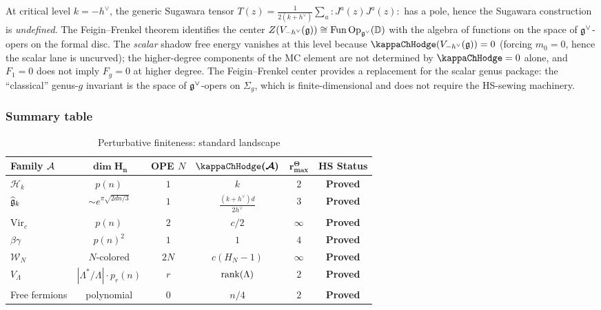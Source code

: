 \begin{remark}
At critical level $k = -h^\vee$, the generic Sugawara tensor $T(z) = \frac{1}{2(k+h^\vee)} \sum_a :J^a(z) J^a(z):$ has a pole, hence the Sugawara construction is \emph{undefined}. The Feigin--Frenkel theorem identifies the center $Z(V_{-h^\vee}(\mathfrak{g})) \cong \mathrm{Fun}\,\mathrm{Op}_{\mathfrak{g}^\vee}(\mathbb{D})$ with the algebra of functions on the space of $\mathfrak{g}^\vee$-opers on the formal disc. The \emph{scalar} shadow free energy vanishes at this level because $\kappaChHodge(V_{-h^\vee}(\fg)) = 0$ (forcing $m_0 = 0$, hence the scalar lane is uncurved); the higher-degree components of the MC element are not determined by $\kappaChHodge=0$ alone, and $F_1 = 0$ does not imply $F_g = 0$ at higher degree. The Feigin--Frenkel center provides a replacement for the scalar genus package: the ``classical'' genus-$g$ invariant is the space of $\mathfrak{g}^\vee$-opers on $\Sigma_g$, which is finite-dimensional and does not require the HS-sewing machinery.
\end{remark}

\subsubsection{Summary table}

\begin{table}[ht]
\centering
\caption{Perturbative finiteness: standard landscape}
\label{tab:thqg-I-finiteness-summary}
\renewcommand{\arraystretch}{1.4}
{\footnotesize
\begin{tabular}{|l|c|c|c|c|c|}
\hline
\textbf{Family $\mathcal{A}$} & $\boldsymbol{\dim H_n}$ & \textbf{OPE $N$} & $\boldsymbol{\kappaChHodge(\cA)}$ & $\boldsymbol{r^\Theta_{\max}}$ & \textbf{HS Status} \\
\hline
$\mathcal{H}_k$ & $p(n)$ & $1$ & $k$ & $2$ & \textbf{Proved} \\
\hline
$\widehat{\mathfrak{g}}_k$ & $\sim e^{\pi\sqrt{2dn/3}}$ & $1$ & $\frac{(k+h^\vee)d}{2h^\vee}$ & $3$ & \textbf{Proved} \\
\hline
$\mathrm{Vir}_c$ & $p(n)$ & $2$ & $c/2$ & $\infty$ & \textbf{Proved} \\
\hline
$\beta\gamma$ & $p(n)^2$ & $1$ & $1$ & $4$ & \textbf{Proved} \\
\hline
$\mathcal{W}_N$ & $N$-colored & $2N$ & $c(H_N - 1)$ & $\infty$ & \textbf{Proved} \\
\hline
$V_\Lambda$ & $|\Lambda^*/\Lambda|\cdot p_r(n)$ & $r$ & $\operatorname{rank}(\Lambda)$ & $2$ & \textbf{Proved} \\
\hline
Free fermions & polynomial & $0$ & $n/4$ & $2$ & \textbf{Proved} \\
\hline
\end{tabular}}
\end{table}

